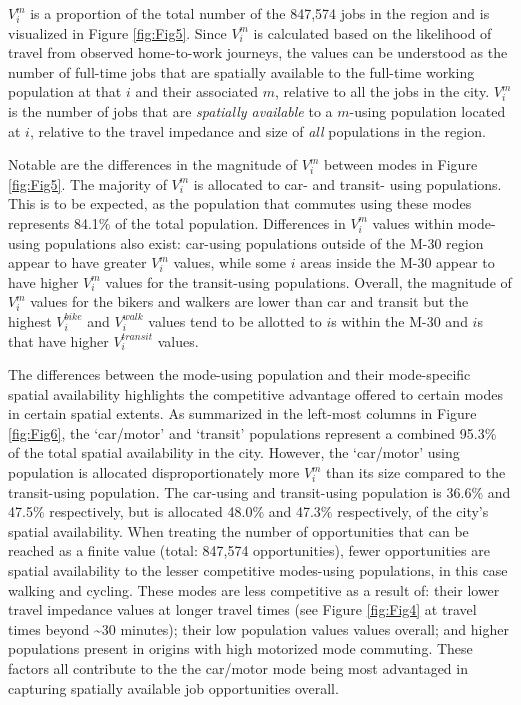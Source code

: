 \documentclass[10pt,letterpaper]{article}
\begin{document}
\(V_i^m\) is a proportion of the total number of the 847,574 jobs in the
region and is visualized in Figure \ref{fig:Fig5}. Since \(V_i^m\) is
calculated based on the likelihood of travel from observed home-to-work
journeys, the values can be understood as the number of full-time jobs
that are spatially available to the full-time working population at that
\(i\) and their associated \(m\), relative to all the jobs in the city.
\(V_i^m\) is the number of jobs that are \emph{spatially available} to a
\(m\)-using population located at \(i\), relative to the travel
impedance and size of \emph{all} populations in the region.

Notable are the differences in the magnitude of \(V_i^m\) between modes
in Figure \ref{fig:Fig5}. The majority of \(V_i^m\) is allocated to car-
and transit- using populations. This is to be expected, as the
population that commutes using these modes represents 84.1\% of the
total population. Differences in \(V_i^m\) values within mode-using
populations also exist: car-using populations outside of the M-30 region
appear to have greater \(V_i^m\) values, while some \(i\) areas inside
the M-30 appear to have higher \(V_i^m\) values for the transit-using
populations. Overall, the magnitude of \(V_i^m\) values for the bikers
and walkers are lower than car and transit but the highest
\(V_i^{bike}\) and \(V_i^{walk}\) values tend to be allotted to \(i\)s
within the M-30 and \(i\)s that have higher \(V_i^{transit}\) values.

The differences between the mode-using population and their
mode-specific spatial availability highlights the competitive advantage
offered to certain modes in certain spatial extents. As summarized in
the left-most columns in Figure \ref{fig:Fig6}, the `car/motor' and
`transit' populations represent a combined 95.3\% of the total spatial
availability in the city. However, the `car/motor' using population is
allocated disproportionately more \(V_i^m\) than its size compared to
the transit-using population. The car-using and transit-using population
is 36.6\% and 47.5\% respectively, but is allocated 48.0\% and 47.3\%
respectively, of the city's spatial availability. When treating the
number of opportunities that can be reached as a finite value (total:
847,574 opportunities), fewer opportunities are spatial availability to
the lesser competitive modes-using populations, in this case walking and
cycling. These modes are less competitive as a result of: their lower
travel impedance values at longer travel times (see Figure
\ref{fig:Fig4} at travel times beyond \textasciitilde30 minutes); their
low population values values overall; and higher populations present in
origins with high motorized mode commuting. These factors all contribute
to the the car/motor mode being most advantaged in capturing spatially
available job opportunities overall.
\end{document}
